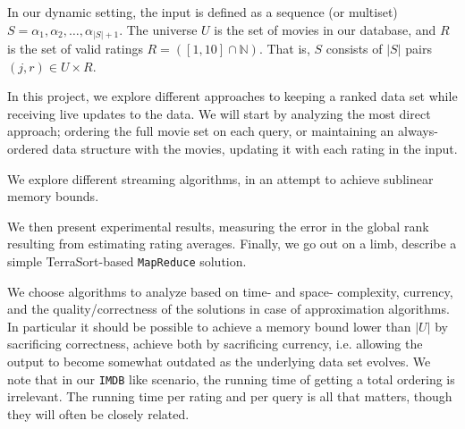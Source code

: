 \documentclass[a4paper, titlepage]{report}
\renewcommand{\%}{\scalebox{.9}{\oldpct}}
\begin{document}
In our dynamic setting, the input is defined as a sequence (or multiset) $S =
\alpha_1, \alpha_2,\ldots,\alpha_{|S|+1}$. The universe $U$ is the set of movies
in our database, and $R$ is the set of valid ratings $R =
\left(\left[1,10\right]\cap \mathbb{N}\right)$. That is, $S$ consists of $|S|$
pairs $(j,r)\in U \times R$.

In this project, we explore different approaches to keeping a ranked data set
while receiving live updates to the data. We will start by analyzing the most
direct approach; ordering the full movie set on each query, or maintaining an
always-ordered data structure with the movies, updating it with each rating in
the input.

We explore different streaming algorithms, in an attempt to achieve sublinear
memory bounds.

We then present experimental results, measuring the error in the
global rank resulting from estimating rating averages. Finally, we go out on a
limb, describe a simple TerraSort-based \texttt{MapReduce} solution.

We choose algorithms to analyze based on time- and space- complexity, currency,
and the quality/correctness of the solutions in case of approximation
algorithms.
In particular it should be possible to achieve a memory bound lower than $|U|$ by
sacrificing correctness, achieve both by sacrificing currency, i.e. allowing the
output to become somewhat outdated as the underlying data set evolves. We note
that in our \texttt{IMDB} like scenario, the running time of getting a total
ordering is irrelevant. The running time per rating and per query is all that
matters, though they will often be closely related. 
\end{document}

